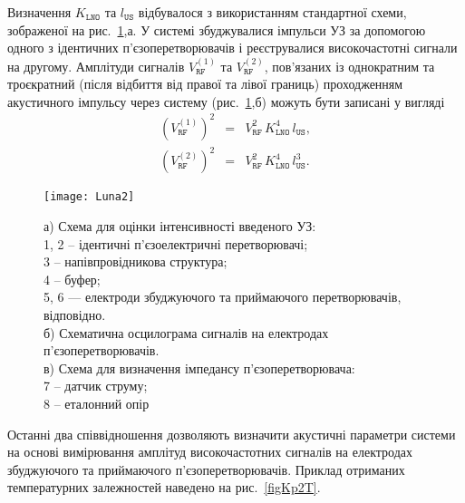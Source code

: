Визначення $K_\mathtt{LNO}$ та $l_\mathtt{US}$ відбувалося з використанням стандартної схеми,
зображеної на рис.~\ref{Luna2},а.
У системі збуджувалися імпульси УЗ за допомогою одного з ідентичних п'єзоперетворювачів і реєструвалися
високочастотні сигнали на другому.
Амплітуди сигналів $V_\mathtt{RF}^{(1)}$ та $V_\mathtt{RF}^{(2)}$, пов'язаних із однократним та троєкратний (після відбиття від правої та лівої границь) проходженням акустичного імпульсу через систему
(рис.~\ref{Luna2},б) можуть бути записані у вигляді
\begin{eqnarray}
  \label{eqVrf1} (V_\mathtt{RF}^{(1)})^2&=&V_\mathtt{RF}^2\,K_\mathtt{LNO}^4\,l_\mathtt{US}, \\
  \label{eqVrf2} (V_\mathtt{RF}^{(2)})^2&=&V_\mathtt{RF}^2\,K_\mathtt{LNO}^4\,l_\mathtt{US}^3.
\end{eqnarray}


\begin{figure}
\center
\texttt{[image: Luna2]}%
\caption{\label{Luna2}
а) Схема для оцінки інтенсивності введеного УЗ:\protect\\
1, 2 -- ідентичні п'єзоелектричні перетворювачі; \protect\\
3 -- напівпровідникова структура;\protect\\
4 -- буфер; \protect\\
5, 6 --- електроди збуджуючого та приймаючого перетворювачів, відповідно. \protect\\
б) Схематична осцилограма сигналів на електродах п'єзоперетворювачів. \protect\\
в) Схема для визначення імпедансу п'єзоперетворювача: \protect\\
7 -- датчик струму; \protect\\
8 -- еталонний опір
}
\end{figure}

Останні два співвідношення дозволяють визначити акустичні параметри системи на основі вимірювання амплітуд
високочастотних сигналів на електродах збуджуючого та приймаючого п'єзоперетворювачів.
Приклад отриманих температурних залежностей наведено на рис.~\ref{figKp2T}.

